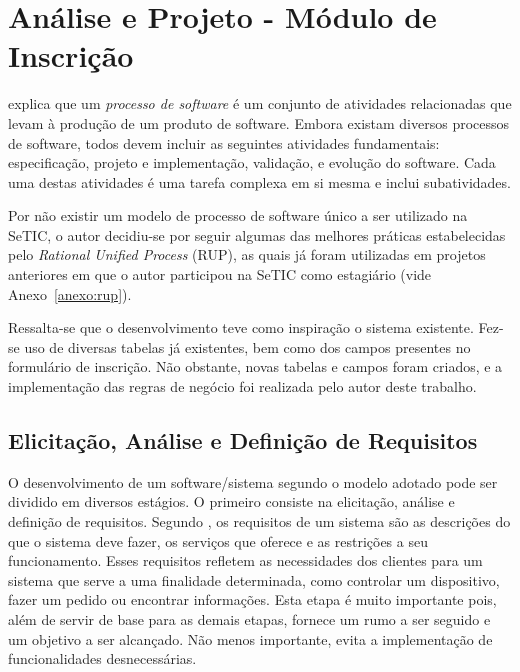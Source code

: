 \documentclass[
  10.5pt,				  %
	openright,			%
	twoside,			  %
  a5paper,
  chapter=TITLE,	%
	section=TITLE,	%
  hyphens,        %
	english,        %
	brazil          %
]{abntex2}
\begin{document}




\chapter{Análise e Projeto - Módulo de Inscrição}

 explica que um \emph{processo de software} é um conjunto de atividades relacionadas que levam à produção de um produto de software. Embora existam diversos processos de software, todos devem incluir as seguintes atividades fundamentais: especificação, projeto e implementação, validação, e evolução do software. Cada uma destas atividades é uma tarefa complexa em si mesma e inclui subatividades.

Por não existir um modelo de processo de software único a ser utilizado na SeTIC, o autor decidiu-se por seguir algumas das melhores práticas estabelecidas pelo \emph{Rational Unified Process} (RUP), as quais já foram utilizadas em projetos anteriores em que o autor participou na SeTIC como estagiário (vide Anexo~\ref{anexo:rup}).

Ressalta-se que o desenvolvimento teve como inspiração o sistema existente. Fez-se uso de diversas tabelas já existentes, bem como dos campos presentes no formulário de inscrição. Não obstante, novas tabelas e campos foram criados, e a implementação das regras de negócio foi realizada pelo autor deste trabalho.


\section{Elicitação, Análise e Definição de Requisitos}

O desenvolvimento de um software/sistema segundo o modelo adotado pode ser dividido em diversos estágios. O primeiro consiste na elicitação, análise e definição de requisitos. Segundo , os requisitos de um sistema são as descrições do que o sistema deve fazer, os serviços que oferece e as restrições a seu funcionamento. Esses requisitos refletem as necessidades dos clientes para um sistema que serve a uma finalidade determinada, como controlar um dispositivo, fazer um pedido ou encontrar informações. Esta etapa é muito importante pois, além de servir de base para as demais etapas, fornece um rumo a ser seguido e um objetivo a ser alcançado. Não menos importante, evita a implementação de funcionalidades desnecessárias.
\end{document}

